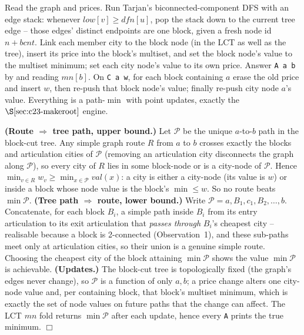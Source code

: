 Read the graph and prices. Run Tarjan's biconnected-component DFS with an edge stack: whenever
\(\mathit{low}[v]\ge \mathit{dfn}[u]\), pop the stack down to the current tree edge -- those edges'
distinct endpoints are one block, given a fresh node id \(n+\mathit{bcnt}\). Link each member city to
the block node (in the LCT as well as the tree), insert its price into the block's multiset, and set
the block node's value to the multiset minimum; set each city node's value to its own price. Answer
\texttt{A a b} by  and reading \(\mathit{mn}[b]\). On \texttt{C a w}, for
each block containing \(a\) erase the old price and insert \(w\), then re-push that block node's value;
finally re-push city node \(a\)'s value. Everything is a path-\(\min\) with point updates, exactly the
\(\secref{c23-makeroot}\) engine.

\begin{proofbox}
\textbf{(Route \(\Rightarrow\) tree path, upper bound.)} Let \(\mathcal{P}\) be the unique
\(a\)-to-\(b\) path in the block-cut tree. Any simple graph route \(R\) from \(a\) to \(b\) crosses
exactly the blocks and articulation cities of \(\mathcal{P}\) (removing an articulation city
disconnects the graph along \(\mathcal{P}\)), so every city of \(R\) lies in some block-node or is a
city-node of \(\mathcal{P}\). Hence \(\min_{v\in R} w_v \ge \min_{x\in\mathcal{P}} \mathit{val}(x)\):
a city is either a city-node (its value is \(w\)) or inside a block whose node value is the block's
\(\min\le w\). So no route beats \(\min\mathcal{P}\). \textbf{(Tree path \(\Rightarrow\) route, lower
bound.)} Write \(\mathcal{P}=a, B_1, c_1, B_2,\dots,b\). Concatenate, for each block \(B_i\), a simple
path inside \(B_i\) from its entry articulation to its exit articulation that \emph{passes through}
\(B_i\)'s cheapest city -- realisable because a block is 2-connected (Observation~1), and these sub-paths
meet only at articulation cities, so their union is a genuine simple route. Choosing the cheapest city
of the block attaining \(\min\mathcal{P}\) shows the value \(\min\mathcal{P}\) is achievable. \textbf{(Updates.)}
The block-cut tree is topologically fixed (the graph's edges never change), so \(\mathcal{P}\) is a
function of only \(a,b\); a price change alters one city-node value and, per containing block, that
block's multiset minimum, which is exactly the set of node values on future paths that the change can
affect. The LCT \(\mathit{mn}\) fold returns \(\min\mathcal{P}\) after each update, hence every
\texttt{A} prints the true minimum. \(\Box\)
\end{proofbox}

